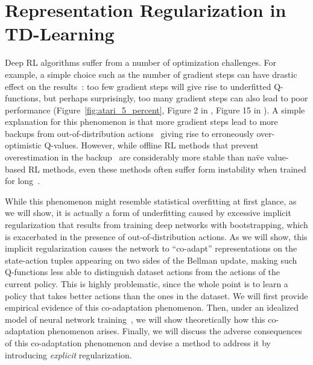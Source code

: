 \section{Representation Regularization in TD-Learning}
\label{sec:problem}

Deep RL algorithms suffer from a number of optimization challenges. For example, a simple choice such as the number of gradient steps can have drastic effect on the results~\citep{fedus2020revisiting, fu2019diagnosing}: too few gradient steps will give rise to underfitted Q-functions, but perhaps surprisingly, too many gradient steps can also lead to poor performance (Figure~\ref{fig:atari_5_percent}, Figure 2 in \citep{kumar2021implicit}, Figure 15 in \citep{fu2019diagnosing}). A simple explanation for this phenomenon is that more gradient steps lead to more backups from out-of-distribution actions~\citep{kumar19bear} giving rise to erroneously over-optimistic Q-values. However, while offline RL methods that prevent overestimation in the backup~\citep{wu2019behavior,kumar2020conservative} are considerably more stable than na\"ve value-based RL methods, even these methods often suffer form instability when trained for long~\citep{kumar2021implicit}.  

While this phenomenon might resemble statistical overfitting at first glance, as we will show, it is actually a form of underfitting caused by excessive implicit regularization that results from training deep networks with bootstrapping, which is exacerbated in the presence of out-of-distribution actions. As we will show, this implicit regularization causes the network to ``co-adapt'' representations on the state-action tuples appearing on two sides of the Bellman update, making such Q-functions less able to distinguish dataset actions from the actions of the current policy. This is highly problematic, since the whole point is to learn a policy that takes better actions than the ones in the dataset.
We will first provide empirical evidence of this co-adaptation phenomenon. Then, under an idealized model of neural network training~\citep{wei2019regularization,savarese2019infinite}, we will show theoretically how this co-adaptation phenomenon arises. Finally, we will discuss the adverse consequences of this co-adaptation phenomenon and devise a method to address it by introducing \emph{explicit} regularization.

